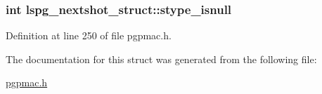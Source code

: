 \hypertarget{structlspg__nextshot__struct_a79f48c452a4aca8506bae22f897c7441}{
\subsubsection[{stype\-\_\-isnull}]{\setlength{\rightskip}{0pt plus 5cm}int lspg\-\_\-nextshot\-\_\-struct\-::stype\-\_\-isnull}}\label{structlspg__nextshot__struct_a79f48c452a4aca8506bae22f897c7441}


Definition at line 250 of file pgpmac.\-h.



The documentation for this struct was generated from the following file\-:\begin{DoxyCompactItemize}
\item 
\hyperlink{pgpmac_8h}{pgpmac.\-h}\end{DoxyCompactItemize}
